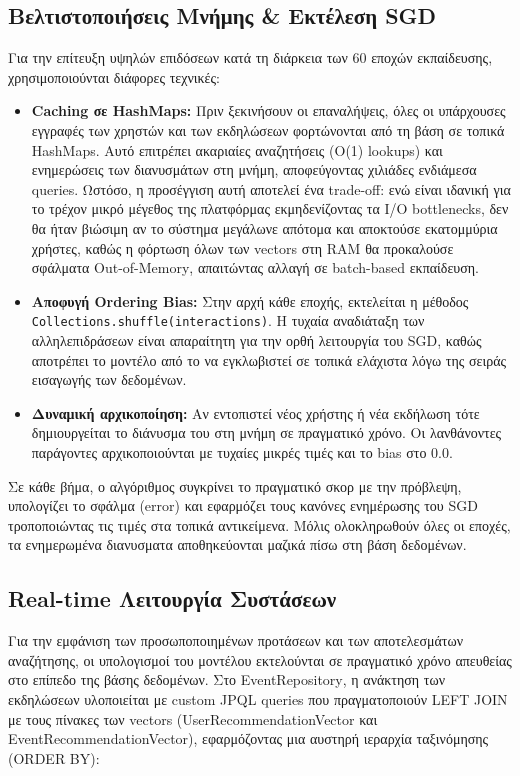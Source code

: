 \documentclass[12pt]{fphw}
\newcommand{\en}[1]{\foreignlanguage{english}{#1}}
\begin{document}
\subsection{Βελτιστοποιήσεις Μνήμης \& Εκτέλεση SGD}
Για την επίτευξη υψηλών επιδόσεων κατά τη διάρκεια των 60 εποχών εκπαίδευσης, χρησιμοποιούνται διάφορες τεχνικές:
\begin{itemize}[leftmargin=*]
    \item \textbf{Caching σε HashMaps:} Πριν ξεκινήσουν οι επαναλήψεις, όλες οι υπάρχουσες εγγραφές των χρηστών και των εκδηλώσεων φορτώνονται από τη βάση σε τοπικά \en{HashMaps}. Αυτό επιτρέπει ακαριαίες αναζητήσεις (\en{O(1)} lookups) και ενημερώσεις των διανυσμάτων στη μνήμη, αποφεύγοντας χιλιάδες ενδιάμεσα queries. Ωστόσο, η προσέγγιση αυτή αποτελεί ένα \en{trade-off}: ενώ είναι ιδανική για το τρέχον μικρό μέγεθος της πλατφόρμας εκμηδενίζοντας τα \en{I/O bottlenecks}, δεν θα ήταν βιώσιμη αν το σύστημα μεγάλωνε απότομα και αποκτούσε εκατομμύρια χρήστες, καθώς η φόρτωση όλων των vectors στη \en{RAM} θα προκαλούσε σφάλματα \en{Out-of-Memory}, απαιτώντας αλλαγή σε \en{batch-based} εκπαίδευση.
    \item \textbf{Αποφυγή Ordering Bias:} Στην αρχή κάθε εποχής, εκτελείται η μέθοδος \en{\texttt{Collections.shuffle(interactions)}}. Η τυχαία αναδιάταξη των αλληλεπιδράσεων είναι απαραίτητη για την ορθή λειτουργία του \en{SGD}, καθώς αποτρέπει το μοντέλο από το να εγκλωβιστεί σε τοπικά ελάχιστα λόγω της σειράς εισαγωγής των δεδομένων.
    \item \textbf{Δυναμική αρχικοποίηση:} Αν εντοπιστεί νέος χρήστης ή νέα εκδήλωση τότε δημιουργείται το διάνυσμα του στη μνήμη σε πραγματικό χρόνο. Οι λανθάνοντες παράγοντες αρχικοποιούνται με τυχαίες μικρές τιμές και το \en{bias} στο 0.0.
\end{itemize}
Σε κάθε βήμα, ο αλγόριθμος συγκρίνει το πραγματικό σκορ με την πρόβλεψη, υπολογίζει το σφάλμα (\en{error}) και εφαρμόζει τους κανόνες ενημέρωσης του \en{SGD} τροποποιώντας τις τιμές στα τοπικά αντικείμενα. Μόλις ολοκληρωθούν όλες οι εποχές, τα ενημερωμένα διανυσματα αποθηκεύονται μαζικά πίσω στη βάση δεδομένων.


\subsection{Real-time Λειτουργία Συστάσεων}
Για την εμφάνιση των προσωποποιημένων προτάσεων και των αποτελεσμάτων αναζήτησης, οι υπολογισμοί του μοντέλου εκτελούνται σε πραγματικό χρόνο απευθείας στο επίπεδο της βάσης δεδομένων. Στο \en{EventRepository}, η ανάκτηση των εκδηλώσεων υλοποιείται με custom JPQL queries που πραγματοποιούν \en{LEFT JOIN} με τους πίνακες των vectors (\en{UserRecommendationVector} και \en{EventRecommendationVector}), εφαρμόζοντας μια αυστηρή ιεραρχία ταξινόμησης (\en{ORDER BY}):
\end{document}
